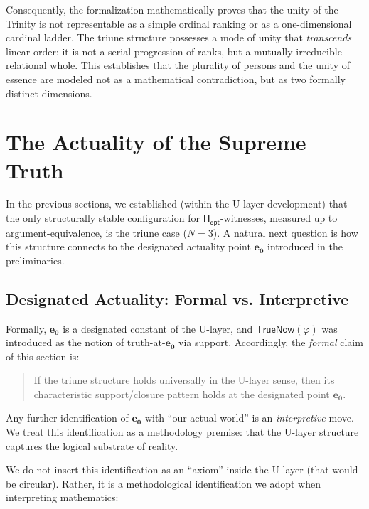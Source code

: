 \documentclass[a4paper, 11pt]{article}
\theoremstyle{plain}
\theoremstyle{definition}
\newcommand{\TrueNow}{\mathsf{TrueNow}}   %
\newcommand{\Hopt}{\mathsf{H_{opt}}}       %
\newcommand{\eZero}{\mathbf{e_0}}         %
\begin{document}
Consequently, the formalization mathematically proves that the unity of the Trinity is not representable as a simple ordinal ranking or as a one-dimensional cardinal ladder. The triune structure possesses a mode of unity that \emph{transcends} linear order: it is not a serial progression of ranks, but a mutually irreducible relational whole. This establishes that the plurality of persons and the unity of essence are modeled not as a mathematical contradiction, but as two formally distinct dimensions.

\newpage


\section{The Actuality of the Supreme Truth}
\label{sec:actuality}

In the previous sections, we established (within the U-layer development) that the only structurally stable configuration for $\Hopt$-witnesses, measured up to argument-equivalence, is the triune case ($N=3$).
A natural next question is how this structure connects to the designated actuality point $\eZero$ introduced in the preliminaries.

\subsection{Designated Actuality: Formal vs. Interpretive}

Formally, $\eZero$ is a designated constant of the U-layer, and $\TrueNow(\varphi)$ was introduced as the notion of truth-at-$\eZero$ via support.
Accordingly, the \emph{formal} claim of this section is:

\begin{quote}
If the triune structure holds universally in the U-layer sense, then its characteristic support/closure pattern holds at the designated point $\eZero$.
\end{quote}

Any further identification of $\eZero$ with ``our actual world'' is an \emph{interpretive} move. We treat this identification as a methodology premise: that the U-layer structure captures the logical substrate of reality.

We do not insert this identification as an ``axiom'' inside the U-layer (that would be circular). Rather, it is a methodological identification we adopt when interpreting mathematics:
\end{document}
